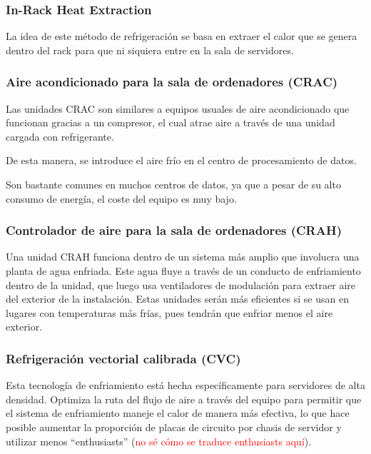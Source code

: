 \subsubsection{In-Rack Heat Extraction}

La idea de este método de refrigeración se basa en extraer el calor que se genera dentro del rack para que ni siquiera entre en la sala de servidores.

\subsubsection{Aire acondicionado para la sala de ordenadores (CRAC)}

Las unidades CRAC son similares a equipos usuales de aire acondicionado que funcionan gracias a un compresor, el cual atrae aire a través de una unidad cargada con refrigerante.

De esta manera, se introduce el aire frío en el centro de procesamiento de datos.

Son bastante comunes en muchos centros de datos, ya que a pesar de su alto consumo de energía, el coste del equipo es muy bajo.

\subsubsection{Controlador de aire para la sala de ordenadores (CRAH)}

Una unidad CRAH funciona dentro de un sistema más amplio que involucra una planta de agua enfriada. Este agua fluye a través de un conducto de enfriamiento dentro de la unidad, que luego usa ventiladores de modulación para extraer aire del exterior de la instalación. Estas unidades serán más eficientes si se usan en lugares con temperaturas más frías, pues tendrán que enfriar menos el aire exterior.

\subsubsection{Refrigeración vectorial calibrada (CVC)}

Esta tecnología de enfriamiento está hecha específicamente para servidores de alta densidad. Optimiza la ruta del flujo de aire a través del equipo para permitir que el sistema de enfriamiento maneje el calor de manera más efectiva, lo que hace posible aumentar la proporción de placas de circuito por chasis de servidor y utilizar menos “enthusiasts” (\textcolor{red}{no sé cómo se traduce enthusiasts aquí}).

